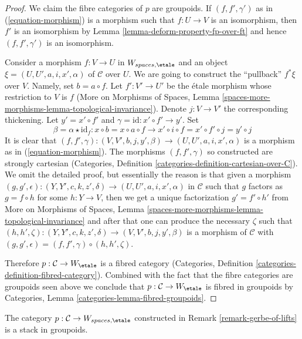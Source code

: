 \begin{proof}
We claim the fibre categories of $p$ are groupoids.
If $(f, f', \gamma')$ as in (\ref{equation-morphism})
is a morphism such that $f : U \to V$ is an isomorphism, then
$f'$ is an isomorphism by Lemma \ref{lemma-deform-property-fp-over-ft}
and hence $(f, f', \gamma')$ is an isomorphism.

\medskip\noindent
Consider a morphism $f : V \to U$ in $W_{spaces, \etale}$
and an object $\xi = (U, U', a, i, x', \alpha)$
of $\mathcal{C}$ over $U$. We are going to construct the ``pullback''
$f^*\xi$ over $V$. 
Namely, set $b = a \circ f$. Let $f' : V' \to U'$ be the \'etale morphism
whose restriction to $V$ is $f$ (More on Morphisms of Spaces,
Lemma \ref{spaces-more-morphisms-lemma-topological-invariance}).
Denote $j : V \to V'$ the corresponding thickening.
Let $y' = x' \circ f'$ and $\gamma = \text{id} : x' \circ f' \to y'$.
Set
$$
\beta = \alpha \star \text{id}_f :
x \circ b = x \circ a \circ f \to
x' \circ i \circ f = x' \circ f' \circ j = y' \circ j
$$
It is clear that $(f, f', \gamma) : (V, V', b, j, y', \beta) \to
(U, U', a, i, x', \alpha)$ is a morphism as in
(\ref{equation-morphism}). The morphisms $(f, f', \gamma)$
so constructed are strongly cartesian
(Categories, Definition \ref{categories-definition-cartesian-over-C}).
We omit the detailed proof, but essentially the reason is that
given a morphism
$(g, g', \epsilon) : (Y, Y', c, k, z', \delta) \to (U, U', a, i, x', \alpha)$
in $\mathcal{C}$ such that $g$ factors as $g = f \circ h$ for some
$h : Y \to V$, then we get a unique factorization $g' = f' \circ h'$
from More on Morphisms of Spaces,
Lemma \ref{spaces-more-morphisms-lemma-topological-invariance}
and after that one can produce the necessary $\zeta$ such that
$(h, h', \zeta) :  (Y, Y', c, k, z', \delta) \to
(V, V', b, j, y', \beta)$ is a morphism of $\mathcal{C}$
with $(g, g', \epsilon) = (f, f', \gamma) \circ (h, h', \zeta)$.

\medskip\noindent
Therefore $p : \mathcal{C} \to W_\etale$ is a fibred
category (Categories, Definition \ref{categories-definition-fibred-category}).
Combined with the fact that the fibre categories are groupoids
seen above we conclude that $p : \mathcal{C} \to W_\etale$
is fibred in groupoids by Categories, Lemma
\ref{categories-lemma-fibred-groupoids}.
\end{proof}

\begin{lemma}
\label{lemma-gerbe-of-lifts-stack}
The category $p : \mathcal{C} \to W_{spaces, \etale}$ constructed
in Remark \ref{remark-gerbe-of-lifts} is a stack in groupoids.
\end{lemma}

